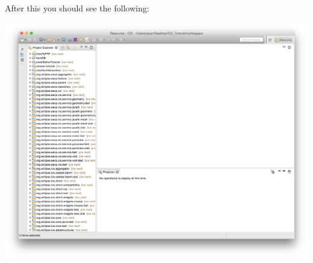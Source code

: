 \documentclass{article}
\begin{document}
After this you should see the following:
\begin{center} \includegraphics[width=\textwidth]{figures/cloned} \end{center}
\end{document}
